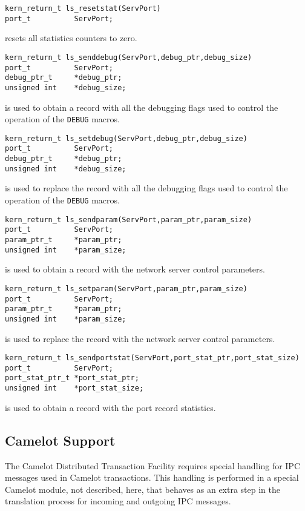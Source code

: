 \begin{verbatim}
kern_return_t ls_resetstat(ServPort)
port_t          ServPort;
\end{verbatim}
resets all statistics counters to zero.

\begin{verbatim}
kern_return_t ls_senddebug(ServPort,debug_ptr,debug_size)
port_t          ServPort;
debug_ptr_t     *debug_ptr;
unsigned int    *debug_size;
\end{verbatim}
is used to obtain a record with all the debugging flags used to
control the operation of the \verb"DEBUG" macros.

\begin{verbatim}
kern_return_t ls_setdebug(ServPort,debug_ptr,debug_size)
port_t          ServPort;
debug_ptr_t     *debug_ptr;
unsigned int    *debug_size;
\end{verbatim}
is used to replace the record with all the debugging flags used to
control the operation of the \verb"DEBUG" macros.

\begin{verbatim}
kern_return_t ls_sendparam(ServPort,param_ptr,param_size)
port_t          ServPort;
param_ptr_t     *param_ptr;
unsigned int    *param_size;
\end{verbatim}
is used to obtain a record with the network server control parameters.

\begin{verbatim}
kern_return_t ls_setparam(ServPort,param_ptr,param_size)
port_t          ServPort;
param_ptr_t     *param_ptr;
unsigned int    *param_size;
\end{verbatim}
is used to replace the record with the network server control parameters.

\begin{verbatim}
kern_return_t ls_sendportstat(ServPort,port_stat_ptr,port_stat_size)
port_t          ServPort;
port_stat_ptr_t *port_stat_ptr;
unsigned int    *port_stat_size;
\end{verbatim}
is used to obtain a record with the port record statistics.

\subsection{Camelot Support}
The Camelot Distributed Transaction Facility \cite{CAMELOT} requires
special handling for IPC messages used in Camelot transactions. This
handling is performed in a special Camelot module, not described,
here, that behaves as an extra step in the translation process for
incoming and outgoing IPC messages.

